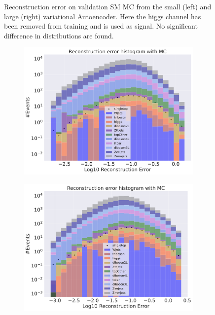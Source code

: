 \begin{figure}[H]
\begin{subfigure}{.45\textwidth}
        \caption{ }
        \label{fig:vae_big_higgs}
    \end{subfigure}
    \hfill  
    \caption[VAE | Reconstruction error using Higgs channel as signal]{Reconstruction error on validation SM MC from the small (left) and large (right) variational Autoencoder. Here the higgs channel has been removed from training and 
    is used as signal. No significant difference in distributions are found. }
    \label{fig:vae_big_channel_1}
\end{figure}

\begin{figure}[H]
    \centering
    \begin{subfigure}{.45\textwidth}
        \includegraphics[width=\textwidth]{Figures/VAE_testing/small/b_data_recon_big_rm3_feats_sig_singletop.pdf}
        \caption{ }
        \label{fig:vae_small_singletop}
    \end{subfigure}
    \hfill
    \begin{subfigure}{.45\textwidth}
        \includegraphics[width=\textwidth]{Figures/VAE_testing/big/b_data_recon_big_rm3_feats_sig_singletop.pdf}

\end{subfigure}
\end{figure}
